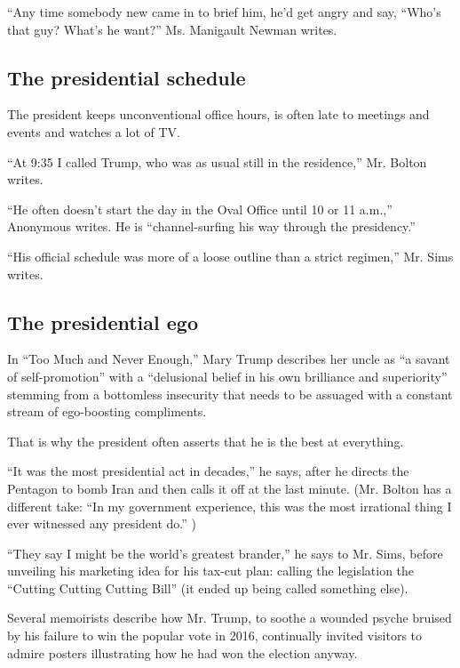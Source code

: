 ``Any time somebody new came in to brief him, he'd get angry and say,
``Who's that guy? What's he want?'' Ms. Manigault Newman writes.

\hypertarget{the-presidential-schedule}{%
\subsection{The presidential schedule}\label{the-presidential-schedule}}

The president keeps unconventional office hours, is often late to
meetings and events and watches a lot of TV.

``At 9:35 I called Trump, who was as usual still in the residence,'' Mr.
Bolton writes.

``He often doesn't start the day in the Oval Office until 10 or 11
a.m.,'' Anonymous writes. He is ``channel-surfing his way through the
presidency.''

``His official schedule was more of a loose outline than a strict
regimen,'' Mr. Sims writes.

\hypertarget{the-presidential-ego}{%
\subsection{The presidential ego}\label{the-presidential-ego}}

In ``Too Much and Never Enough,'' Mary Trump describes her uncle as ``a
savant of self-promotion'' with a ``delusional belief in his own
brilliance and superiority'' stemming from a bottomless insecurity that
needs to be assuaged with a constant stream of ego-boosting compliments.

That is why the president often asserts that he is the best at
everything.

``It was the most presidential act in decades,'' he says, after he
directs the Pentagon to bomb Iran and then calls it off at the last
minute. (Mr. Bolton has a different take: ``In my government experience,
this was the most irrational thing I ever witnessed any president do.''
)

``They say I might be the world's greatest brander,'' he says to Mr.
Sims, before unveiling his marketing idea for his tax-cut plan: calling
the legislation the ``Cutting Cutting Cutting Bill'' (it ended up being
called something else).

Several memoirists describe how Mr. Trump, to soothe a wounded psyche
bruised by his failure to win the popular vote in 2016, continually
invited visitors to admire posters illustrating how he had won the
election anyway.

